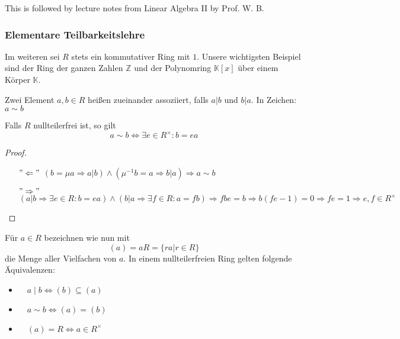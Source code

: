 This is followed by lecture notes from Linear Algebra II by Prof. W. B.
\subsubsection{Elementare Teilbarkeitslehre}
Im weiteren sei \(R\) stets ein kommutativer Ring mit \(1\). Unsere wichtigsten Beispiel sind der Ring der ganzen Zahlen \(\mathbb{Z}\) und der Polynomring \(\mathbb{K}[x]\) \"uber einem K\"orper \(\mathbb{K}\).

\begin{definition}
    Zwei Element \(a,b\in R\) hei\ss en zueinander assoziiert, falls \(a|b\) und \(b|a\). In Zeichen: \(a\sim b\)
\end{definition}
\begin{lemma}
    Falls \(R\) nullteilerfrei ist, so gilt \[a\sim b\Leftrightarrow \exists e\in R^\times :b=ea\]
\end{lemma}
\begin{proof}
    \begin{itemize}
        \item[\("\Leftarrow"\)] \((b=\mu a\Rightarrow a|b)\wedge(\mu^{-1}b =a\Rightarrow b|a)\Rightarrow a\sim b\)
        \item[\("\Rightarrow"\)] \((a|b\Rightarrow \exists e \in R:b=ea)\wedge(b|a\Rightarrow\exists f\in R: a= fb)\Rightarrow fbe=b\Rightarrow b(fe-1)=0\Rightarrow fe = 1\Rightarrow e,f\in R^\times\)
    \end{itemize}
\end{proof}
F\"ur \(a\in R\) bezeichnen wie nun mit \[(a) = a R=\{ra|r\in R\}\]
die Menge aller Vielfachen von $a .$ In einem nullteilerfreien Ring gelten folgende Äquivalenzen:
\begin{itemize}
    \item  $\quad a \mid b \Longleftrightarrow(b) \subseteq(a)$
    \item \( \quad a \sim b \Longleftrightarrow(a)=(b)\)
    \item \( \quad(a)=R \Longleftrightarrow a \in R^{\times} \)

\end{itemize}

